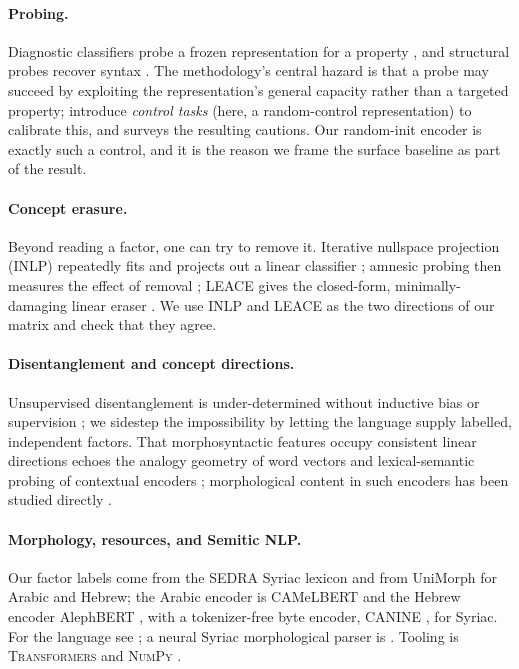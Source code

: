 \documentclass[11pt]{article}
\begin{document}
\paragraph{Probing.}
Diagnostic classifiers probe a frozen representation for a property
\citep{conneau2018probing,belinkov2017morphology}, and structural probes recover
syntax \citep{hewitt2019structural}. The methodology's central hazard is that a
probe may succeed by exploiting the representation's general capacity rather than a
targeted property; \citet{hewitt2019control} introduce \emph{control tasks} (here, a
random-control representation) to calibrate this, and \citet{belinkov2022probing}
surveys the resulting cautions. Our random-init encoder is exactly such a control,
and it is the reason we frame the surface baseline as part of the result.

\paragraph{Concept erasure.}
Beyond reading a factor, one can try to remove it. Iterative nullspace projection
(INLP) repeatedly fits and projects out a linear classifier
\citep{ravfogel2020null}; amnesic probing then measures the effect of removal
\citep{elazar2021amnesic}; LEACE gives the closed-form, minimally-damaging linear
eraser \citep{belrose2023leace}. We use INLP and LEACE as the two directions of our
matrix and check that they agree.

\paragraph{Disentanglement and concept directions.}
Unsupervised disentanglement is under-determined without inductive bias or
supervision \citep{locatello2019challenging,higgins2018definition}; we sidestep the
impossibility by letting the language supply labelled, independent factors. That
morphosyntactic features occupy consistent linear directions echoes the analogy
geometry of word vectors \citep{mikolov2013linguistic} and lexical-semantic probing
of contextual encoders \citep{vulic2020probing}; morphological content in such
encoders has been studied directly \citep{edmiston2020systematic}.

\paragraph{Morphology, resources, and Semitic NLP.}
Our factor labels come from the SEDRA Syriac lexicon \citep{kiraz1994sedra} and from
UniMorph \citep{mccarthy2020unimorph} for Arabic and Hebrew; the Arabic encoder is
CAMeLBERT \citep{inoue2021camelbert} and the Hebrew encoder AlephBERT
\citep{seker2022alephbert}, with a tokenizer-free byte encoder, CANINE
\citep{clark2022canine}, for Syriac. For the language see
\citet{brock2006introduction,butts2019syriac}; a neural Syriac morphological parser
is \citet{naaijer2023transformer}. Tooling is \textsc{Transformers}
\citep{wolf2020transformers} and \textsc{NumPy} \citep{harris2020numpy}.
\end{document}
